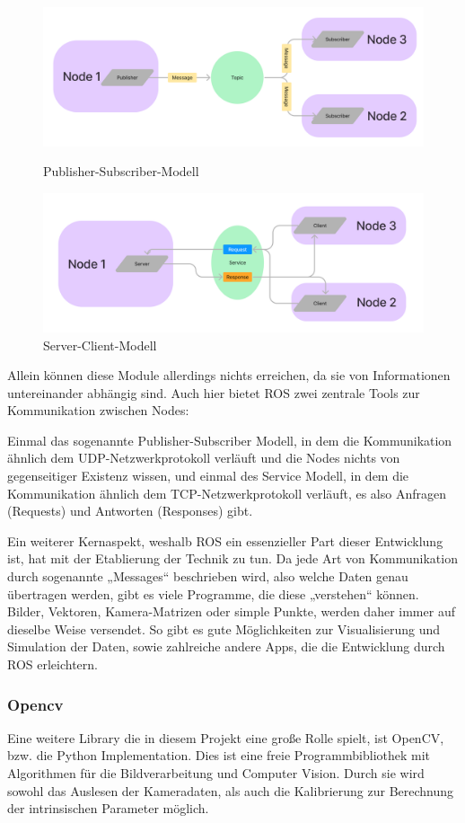 \documentclass[12pt]{article}
\begin{document}
\begin{figure}
\centering
  \includegraphics[angle=0,width=\linewidth]{Publisher.png}
  \caption{Publisher-Subscriber-Modell}
  \includegraphics[angle=0,width=\linewidth]{Server.png}
  \caption{Server-Client-Modell}
\end{figure}
Allein können diese Module allerdings nichts erreichen, da sie von Informationen untereinander abhängig sind. Auch hier bietet ROS zwei zentrale Tools zur Kommunikation zwischen Nodes:  

Einmal das sogenannte Publisher-Subscriber Modell, in dem die Kommunikation ähnlich dem UDP-Netzwerkprotokoll verläuft und die Nodes nichts von gegenseitiger Existenz wissen, und einmal des Service Modell, in dem die Kommunikation ähnlich dem TCP-Netzwerkprotokoll verläuft, es also Anfragen (Requests) und Antworten (Responses) gibt.  

Ein weiterer Kernaspekt, weshalb ROS ein essenzieller Part dieser Entwicklung ist, hat mit der Etablierung der Technik zu tun. Da jede Art von Kommunikation durch sogenannte „Messages“ beschrieben wird, also welche Daten genau übertragen werden, gibt es viele Programme, die diese „verstehen“ können. Bilder, Vektoren, Kamera-Matrizen oder simple Punkte, werden daher immer auf dieselbe Weise versendet. So gibt es gute Möglichkeiten zur Visualisierung und Simulation der Daten, sowie zahlreiche andere Apps, die die Entwicklung durch ROS erleichtern. 
\subsubsection{Opencv}
Eine weitere Library die in diesem Projekt eine große Rolle spielt, ist OpenCV, bzw. die Python Implementation. Dies ist eine freie Programmbibliothek mit Algorithmen für die Bildverarbeitung und Computer Vision. Durch sie wird sowohl das Auslesen der Kameradaten, als auch die Kalibrierung zur Berechnung der intrinsischen Parameter möglich.
\end{document}
